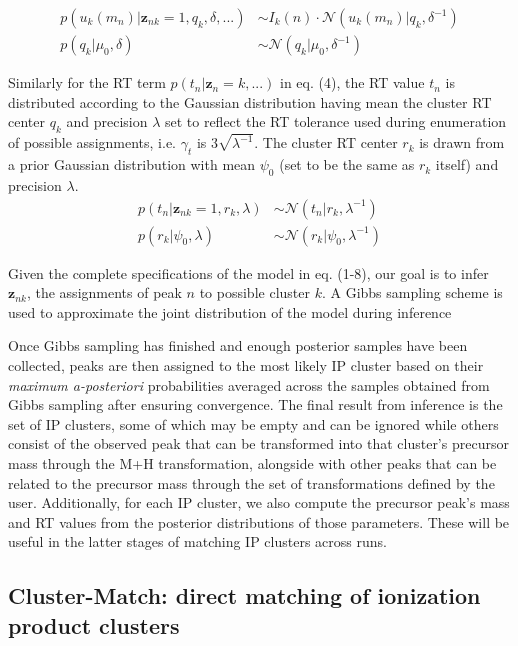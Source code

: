 \begin{align}
p(u_k(m_n)\vert\boldsymbol{z}_{nk}=1,q_k,\delta,...) &\sim I_k(n) \cdot \mathcal{N}(u_k(m_n) \vert q_k,\delta^{-1}) \\
p(q_k\vert \mu_0,\delta) &\sim \mathcal{N}(q_k \vert \mu_0,\delta^{-1})
\end{align}

Similarly for the RT term $p(t_n\vert\boldsymbol{z}_n=k,...)$ in eq. (4), the RT value $t_n$ is distributed according to the Gaussian distribution having mean the cluster RT center $q_k$ and precision $\lambda$ set to reflect the RT tolerance used during enumeration of possible assignments, i.e. $\gamma_t$ is $3\sqrt{\lambda^{-1}}$. The cluster RT center $r_k$ is drawn from a prior Gaussian distribution with mean $\psi_0$ (set to be the same as $r_k$ itself) and precision $\lambda$.
\begin{align}
p(t_n\vert\boldsymbol{z}_{nk}=1,r_k,\lambda) &\sim \mathcal{N}(t_n \vert r_k,\lambda^{-1}) \\
p(r_k\vert \psi_0,\lambda) &\sim \mathcal{N}(r_k \vert \psi_0,\lambda^{-1})
\end{align}

Given the complete specifications of the model in eq. (1-8), our goal is to infer $\boldsymbol{z}_{nk}$, the assignments of peak $n$ to possible cluster $k$. A Gibbs sampling scheme \cite{Rogers2011} is used to approximate the joint distribution of the model during inference 

Once Gibbs sampling has finished and enough posterior samples have been collected, peaks are then assigned to the most likely IP cluster based on their \textit{maximum a-posteriori} probabilities averaged across the samples obtained from Gibbs sampling after ensuring convergence. The final result from inference is the set of IP clusters, some of which may be empty and can be ignored while others consist of the observed peak that can be transformed into that cluster's precursor mass through the M+H transformation, alongside with other peaks that can be related to the precursor mass through the set of transformations defined by the user. Additionally, for each IP cluster, we also compute the precursor peak's mass and RT values from the posterior distributions of those parameters. These will be useful in the latter stages of matching IP clusters across runs.

\subsection{Cluster-Match: direct matching of ionization product clusters\label{sub:cluster-match}}

